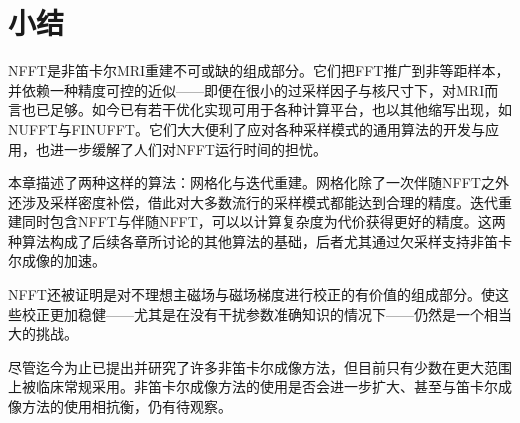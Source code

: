 \documentclass[12pt]{article}
\begin{document}
\section{小结}
NFFT是非笛卡尔MRI重建不可或缺的组成部分。它们把FFT推广到非等距样本，并依赖一种精度可控的近似——即便在很小的过采样因子与核尺寸下，对MRI而言也已足够。如今已有若干优化实现可用于各种计算平台，也以其他缩写出现，如NUFFT与FINUFFT。它们大大便利了应对各种采样模式的通用算法的开发与应用，也进一步缓解了人们对NFFT运行时间的担忧。

本章描述了两种这样的算法：网格化与迭代重建。网格化除了一次伴随NFFT之外还涉及采样密度补偿，借此对大多数流行的采样模式都能达到合理的精度。迭代重建同时包含NFFT与伴随NFFT，可以以计算复杂度为代价获得更好的精度。这两种算法构成了后续各章所讨论的其他算法的基础，后者尤其通过欠采样支持非笛卡尔成像的加速。

NFFT还被证明是对不理想主磁场与磁场梯度进行校正的有价值的组成部分。使这些校正更加稳健——尤其是在没有干扰参数准确知识的情况下——仍然是一个相当大的挑战。

尽管迄今为止已提出并研究了许多非笛卡尔成像方法，但目前只有少数在更大范围上被临床常规采用。非笛卡尔成像方法的使用是否会进一步扩大、甚至与笛卡尔成像方法的使用相抗衡，仍有待观察。

\newpage
\appendix
\end{document}
